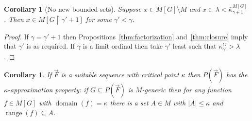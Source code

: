 \documentclass[
twoside,
]{article}
\newtheorem{corollary}[theorem]{Corollary}
\theoremstyle{definition}
\theoremstyle{remark}
\newcommand{\forceKappa}{\bar\kappa} %
\newcommand{\card}[1]{|#1|}
\newcommand{\restrict}{{\upharpoonright}}
\DeclareMathOperator{\range}{range}
\DeclareMathOperator{\domain}{domain}
\begin{document}
\begin{corollary}[No new bounded sets]
  \label{thm:noBoundedSets}
  Suppose  $x\in M[G]\setminus M$ and
  $x\subset\lambda<\forceKappa^{M[G]}_{\gamma+1}$. 
  Then $x\in M[G\restrict\gamma'+1]$ for some $\gamma'<\gamma$. 
\end{corollary}
\begin{proof}
  If $\gamma=\gamma'+1$ then Propositions~\ref{thm:factorization}
  and~\ref{thm:closure} imply that $\gamma'$ is as required.
  If $\gamma$ is a limit ordinal then take $\gamma'$ least such that
  $\forceKappa^{G}_{\gamma'}>\lambda$. 
\end{proof}

\begin{corollary}\label{thm:approx}
  If $\vec F$ is a suitable sequence with critical point $\kappa$ then
  $P(\vec F)$ has the $\kappa$-approximation property: if $G\subseteq
  P(\vec F)$ is $M$-generic then for any function $f\in M[G]$ with
  $\domain(f)=\kappa$ there is a set $A\in M$ with $\card A\leq\kappa$
  and $\range(f)\subseteq A$.
\end{corollary}
\end{document}

